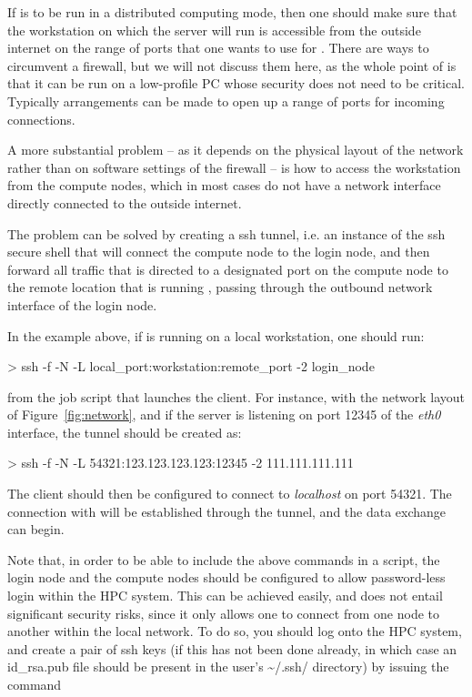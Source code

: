 \documentclass[11pt,english,fleqn]{report}
\newenvironment{code}{%
\footnotesize 
\verbatim
}{
\endverbatim
\normalsize
}
\begin{document}
\label{ssh_sockets}

If \ipi is to be run in a distributed computing mode, then one should
make sure that the workstation on which the server will run is accessible from
the outside internet on the range of ports that one wants to use for
\ipi. There are ways to circumvent a firewall, but we will not discuss them
here, as the whole point of \ipi is that it can be run on a low-profile
PC whose security does not need to be critical. Typically arrangements
can be made to open up a range of ports for incoming connections. 

A more substantial problem -- as it depends on the physical layout
of the network rather than on software settings of the firewall --
is how to access the workstation from the compute nodes, which in most
cases do not have a network interface directly connected to the 
outside internet.

The problem can be solved by creating a ssh tunnel, i.e. an instance of
the ssh secure shell that will connect the compute node to the login node, 
and then forward all traffic that is directed to a designated port
on the compute node to the remote location that is running \ipi, passing
through the outbound network interface of the login node. 

In the example above, if \ipi{} is running on a local workstation, one should run:

\begin{code}
> ssh -f -N -L local_port:workstation:remote_port -2 login_node
\end{code}

\noindent from the job script that launches the client. 
For instance, with the network layout of Figure~\ref{fig:network}, 
and if the \ipi{} server is listening
on port 12345 of the \emph{eth0} interface, the tunnel should be created as:

\begin{code}
> ssh -f -N -L 54321:123.123.123.123:12345 -2 111.111.111.111
\end{code}

\noindent The client should then be configured to connect to \emph{localhost}
on port 54321. The connection with \ipi will be established through the tunnel,
and the data exchange can begin.

Note that, in order to be able to include the above commands in a script,
the login node and the compute nodes should be configured to allow 
password-less login within the HPC system. This can be achieved easily, and
does not entail significant security risks, since it only allows one to 
connect from one node to another within the local network.
To do so, you should log onto the HPC system, and create a pair 
of ssh keys (if this has not been done already, in which case an 
id\_rsa.pub file should be present in the user's \textasciitilde{}/.ssh/ directory) 
by issuing the command 
\end{document}

